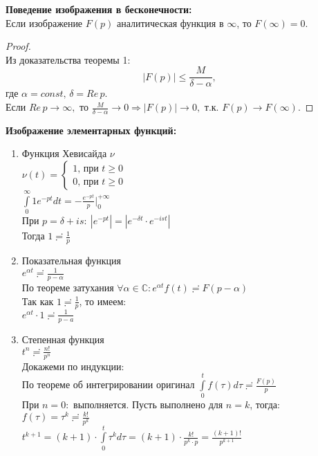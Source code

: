 \textbf{Поведение изображения в бесконечности:}\\[2mm]
Если изображение $F(p)$ аналитическая функция в $\infty$, то $F(\infty)=0$.\\

\begin{proof}
    \ \\
    Из доказательства теоремы 1:
    $$|F(p)|\leq \frac{M}{\delta - \alpha},$$ где $\alpha=const, \, \delta=Re\,p$.\\
    Если $Re\,p\to\infty,$ то $\frac{M}{\delta-\alpha}\to 0 \Rightarrow |F(p)|\to 0,$ т.к. $F(p)\to F(\infty)$.
\end{proof}

\textbf{Изображение элементарных функций:}
\begin{enumerate}
    \item Функция Хевисайда $\nu$\\
    $\nu(t)=
    \begin{cases}
        1\text{, при }t\geq 0\\
        0\text{, при }t\geq 0
    \end{cases}$\\
    $\int\limits_{0}^{\infty}1e^{-pt}dt=-\frac{e^{-pt}}{p}|_0^{+\infty}$\\
    При $p=\delta +i s: \ |e^{-pt}|=|e^{-\delta t}\cdot e^{-i s t}|$\\
    Тогда $1\risingdotseq \frac{1}{p}$

    \item Показательная функция\\
    $e^{\alpha t}\risingdotseq \frac{1}{p-\alpha}$\\
    По теореме затухания $\forall \alpha \in \mathbb{C}: e^{\alpha t} f(t) \risingdotseq F(p-\alpha)$\\
    Так как $1\risingdotseq \frac{1}{p}$, то имеем:\\
    $e^{\alpha t}\cdot 1 \risingdotseq \frac{1}{p-a}$

    \item Степенная функция\\
    $t^n \risingdotseq \frac{n!}{p^n}$\\
    Докажеми по индукции:\\
    По теореме об интегрировании оригинал $\int\limits_{0}^{t} f(\tau)d\tau \risingdotseq \frac{F(p)}{p}$\\
    При $n=0:$ выполняется. Пусть выполнено для $n=k$, тогда:\\
    $f(\tau)=\tau^k \risingdotseq \frac{k!}{p^k}$\\
    $t^{k+1}=(k+1)\cdot\int\limits_{0}^{t}\tau^k d\tau = (k+1)\cdot \frac{k!}{p^k \cdot p} = \frac{(k+1)!}{p^{k+1}}$\\[2mm]
\end{enumerate}

